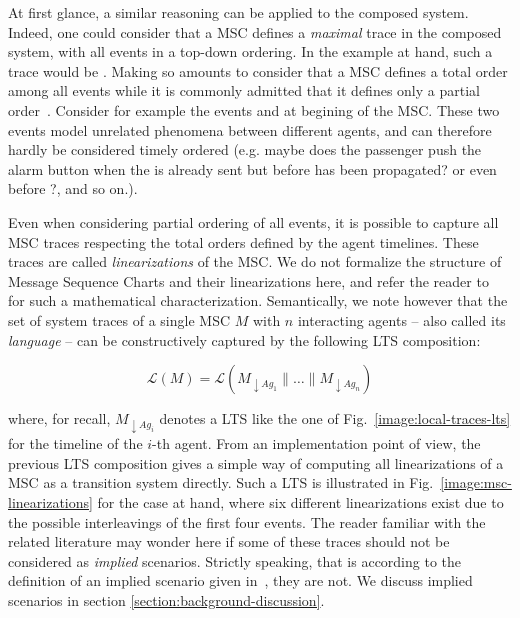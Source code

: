At first glance, a similar reasoning can be applied to the composed system. Indeed, one could consider that a MSC defines a \emph{maximal} trace in the composed system, with all events in a top-down ordering. In the example at hand, such a trace would be . Making so amounts to consider that a MSC defines a total order among all events while it is commonly admitted that it defines only a partial order~\cite{ITU:1996, Uchitel:2003}. Consider for example the events  and  at begining of the MSC. These two events model unrelated phenomena between different agents, and can therefore hardly be considered timely ordered (e.g. maybe does the passenger push the alarm button when the  is already sent but before  has been propagated? or even before ?, and so on.). 

Even when considering partial ordering of all events, it is possible to capture all MSC traces respecting the total orders defined by the agent timelines. These traces are called \emph{linearizations} of the MSC. We do not formalize the structure of Message Sequence Charts and their linearizations here, and refer the reader to~\cite{Uchitel:2003} for such a mathematical characterization. Semantically, we note however that the set of system traces of a single MSC $M$ with $n$ interacting agents -- also called its \emph{language} -- can be constructively captured by the following LTS composition:

\begin{equation}
\label{equation:msc-composition}
\mathcal{L}(M) = \mathcal{L}(M_{\downarrow Ag_1} \parallel \ldots \parallel M_{\downarrow Ag_n})
\end{equation}

\noindent where, for recall, $M_{\downarrow Ag_i}$ denotes a LTS like the one of Fig.~\ref{image:local-traces-lts} for the timeline of the $i$-th agent. From an implementation point of view, the previous LTS composition gives a simple way of computing all linearizations of a MSC as a transition system directly. Such a LTS is illustrated in Fig.~\ref{image:msc-linearizations} for the case at hand, where six different linearizations exist due to the possible interleavings of the first four events. The reader familiar with the related literature may wonder here if some of these traces should not be considered as \emph{implied} scenarios. Strictly speaking, that is according to the definition of an implied scenario given in~\cite{Uchitel:2004}, they are not. We discuss implied scenarios in section \ref{section:background-discussion}.

